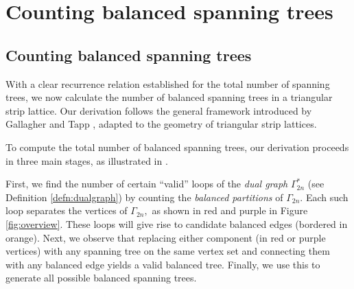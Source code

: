 \documentclass{amsart}
\theoremstyle{definition}
\newcommand{\yandi}[1]{\marginpar{\tiny \color{red} Yandi: #1}}
\newcommand{\saugat}[1]{\marginpar{\tiny \color{blue} Saugat: #1}}
\newcommand{\red}[1]{\textcolor{red}{#1}}
\begin{document}
\section{Counting balanced spanning trees}\label{sec:countingbst}
\subsection{Counting balanced spanning trees}
With a clear recurrence relation established for the total number of spanning trees, we now calculate the number of balanced spanning trees in a triangular strip lattice. Our derivation follows the general framework introduced by Gallagher and Tapp \cite{gal25}, adapted to the geometry of triangular strip lattices. 



To compute the total number of balanced spanning trees, our derivation proceeds in three main stages, as illustrated in .

First, we find the number of certain ``valid'' loops of the \emph{dual graph} $\Gamma^*_{2n}$ (see Definition \ref{defn:dualgraph}) by counting the \emph{balanced partitions} of $\Gamma_{2n}.$ Each such loop separates the vertices of $\Gamma_{2n},$ as shown in red and purple in Figure \ref{fig:overview}. These loops will give rise to candidate balanced edges (bordered in orange). Next, we observe that replacing either component (in red or purple vertices) with any spanning tree on the same vertex set and connecting them with any balanced edge yields a valid balanced tree. Finally, we use this to generate all possible balanced spanning trees. 
\end{document}
